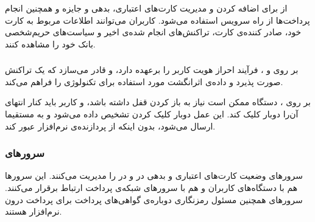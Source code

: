 \documentclass[oneside]{report}
\begin{document}
        \subsubsection{{\small {}}}
        از
           {\normalsize {}}
           برای اضافه کردن و مدیریت کارت‌های اعتباری، بدهی و جایزه و همچنین انجام پرداخت‌ها از راه سرویس 
              {\normalsize {}}
              استفاده می‌شود.
              کاربران می‌توانند اطلاعات مربوط به کارت خود،  صادر کننده‌ی کارت،   تراکنش‌های انجام شده‌ی اخیر و سیاست‌های حریم‌شخصی 
              بانک خود را مشاهده کنند.
 
         \subsubsection{{\small {}}}
                       {\normalsize {}}
    بر روی
               {\normalsize {}} و
                          {\normalsize {}}،
                                     {\normalsize {}}
    فرآیند احراز هویت کاربر را برعهده دارد،  و قادر می‌سازد که یک تراکنش صورت پذیرد و داده‌ی اثرانگشت مورد استفاده برای تکنولوژی 
               {\normalsize {}}
               را فراهم می‌کند. 
               
   بر روی 
              {\normalsize {}}
              ، دستگاه ممکن است نیاز به باز کردن قفل داشته باشد، و کاربر باید کنار انتهای آن‌را دوبار کلیک کند. این عمل دوبار کلیک کردن تشخیص داده می‌شود و به 
                         {\normalsize {}}
                      مستقیما   ارسال می‌شود،   بدون اینکه از پردازنده‌ی نرم‌افزار عبور کند.
                      
      \subsubsection{سرورهای{\small {}}} 
      سرورهای 
   {\normalsize {}}
   وضعیت کارت‌های اعتباری و بدهی در 
   {\normalsize {}}
   و 
   {\normalsize {}}
   در 
   {\normalsize {}}
   را مدیریت می‌کنند. این سرورها هم با دستگاه‌‌های کاربران و هم با سرورهای شبکه‌ی پرداخت ارتباط برقرار می‌کنند.
   سرور‌های 
   {\normalsize {}}
   همچنین مسئول رمزنگاری دوباره‌ی گواهی‌های پرداخت 
         					برای پرداخت درون نرم‌افزار           
   هستند. 
               
\end{document}
